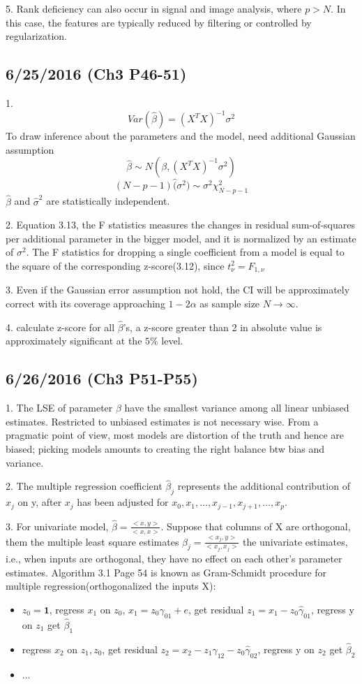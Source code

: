 \documentclass[a4paper, 12pt]{article}
\begin{document}
5. Rank deficiency can also occur in signal and image analysis, where $p>N$. In this case, the features are typically reduced by filtering or controlled by regularization.

\subsection*{6/25/2016 (Ch3 P46-51)}

1.$$Var(\hat{\beta})=(X^TX)^{-1}\sigma^2$$
To  draw inference about the parameters and the  model, need additional Gaussian assumption
$$\hat{\beta} \sim N(\beta,(X^TX)^{-1}\sigma^2 )$$
$$(N-p-1)\hat(\sigma^2) \sim \sigma^2\chi^2_{N-p-1}$$
$\hat{\beta}$ and $\hat{\sigma}^2$ are statistically independent.

2. Equation 3.13, the F statistics measures the changes in residual sum-of-squares per additional parameter in the bigger model, and it is normalized by an estimate of $\sigma^2$. The F statistics for dropping a single coefficient from a model is equal to the square of the corresponding z-score(3.12), since $t_{\nu}^2=F_{1,\nu}$

3. Even if the Gaussian error assumption not hold, the CI will be approximately correct with its coverage approaching $1-2\alpha$ as sample size $N \rightarrow \infty$.

4. calculate z-score for all $\hat{\beta}$'s, a z-score greater than 2 in absolute value is approximately significant at the $5\%$ level.

\subsection*{6/26/2016 (Ch3 P51-P55)}

1. The LSE of parameter $\beta$ have the smallest variance among all linear unbiased estimates. Restricted to unbiased estimates is not necessary wise. From a pragmatic point of view, most models are distortion of the truth and hence are biased; picking models amounts to creating the right balance btw bias and variance.

2. The multiple regression coefficient $\hat{\beta}_j$ represents the additional contribution of $x_j$ on y, after $x_j$ has been adjusted for $x_0,x_1,\ldots,x_{j-1},x_{j+1},\ldots,x_p$.

3. For univariate model, $\hat{\beta}=\frac{<x,y>}{<x,x>}$. Suppose that columns of X are orthogonal, them the multiple least square estimates $\beta_j=\frac{<x_j,y>}{<x_j,x_j>}$ the univariate estimates, i.e., when inputs are orthogonal, they have no effect on each other's parameter estimates. Algorithm 3.1 Page 54 is known as Gram-Schmidt procedure for multiple regression(orthogonalized the inputs X):
\begin{itemize}
	\item $z_0 =\textbf{1}$, regress $x_1$ on $z_0$, $x_1=z_0\gamma_{01} + e$, get residual $z_1=x_1-z_0\hat{\gamma}_{01}$, regress y on $z_1$ get $\hat{\beta}_1$
	\item regress $x_2$ on $z_1,z_0$, get residual $z_2=x_2-z_1\hat{\gamma}_{12}-z_0\hat{\gamma}_{02}$, regress y on $z_2$ get $\hat{\beta}_2$
	\item $\ldots$
\end{itemize}
\end{document}
